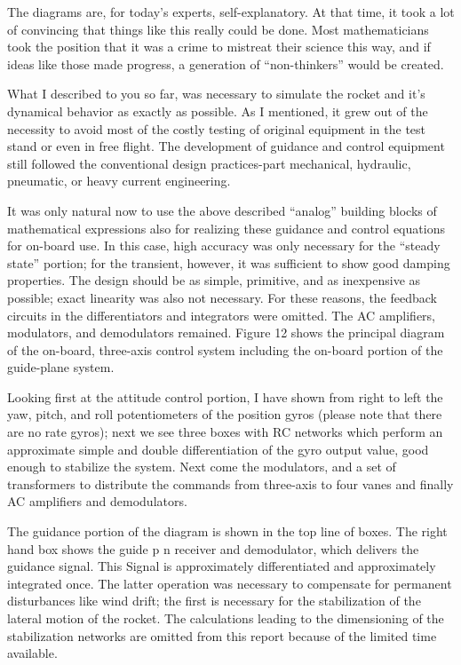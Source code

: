 \documentclass[11pt, a4paper]{article}
\begin{document}
The diagrams are, for today's experts, self-explanatory. At that time, it took a lot of convincing that things like this really could be done. Most mathematicians took the position that it was a crime to mistreat their science this way, and if ideas like those made progress, a generation of ``non-thinkers'' would be created.

What I described to you so far, was necessary to simulate the rocket and it's dynamical behavior as exactly as possible. As I mentioned, it grew out of the necessity to avoid most of the costly testing of original equipment in the test stand or even in free flight. The development of guidance and control equipment still followed the conventional design practices-part mechanical, hydraulic, pneumatic, or heavy current engineering.

It was only natural now to use the above described ``analog'' building blocks of mathematical expressions also for realizing these guidance and control equations for on-board use. In this case, high accuracy was only necessary for the ``steady state'' portion; for the transient, however, it was sufficient to show good damping properties. The design should be as simple, primitive, and as inexpensive as possible; exact linearity was also not necessary. For these reasons, the feedback circuits in the differentiators and integrators were omitted. The AC amplifiers, modulators, and demodulators remained. Figure 12 shows the principal diagram of the on-board, three-axis control system including the on-board portion of the guide-plane system.

Looking first at the attitude control portion, I have shown from right to left the yaw, pitch, and roll potentiometers of the position gyros (please note that there are no rate gyros); next we see three boxes with RC networks which perform an approximate simple and double differentiation of the gyro output value, good enough to stabilize the system. Next come the modulators, and a set of transformers to distribute the commands from three-axis to four vanes and finally AC amplifiers and demodulators.

The guidance portion of the diagram is shown in the top line of boxes. The right hand box shows the guide p n receiver and demodulator, which delivers the guidance signal. This Signal is approximately differentiated and approximately integrated once. The latter operation was necessary to compensate for permanent disturbances like wind drift; the first is necessary for the stabilization of the lateral motion of the rocket. The calculations leading to the dimensioning of the stabilization networks are omitted from this report because of the limited time available.
\end{document}
